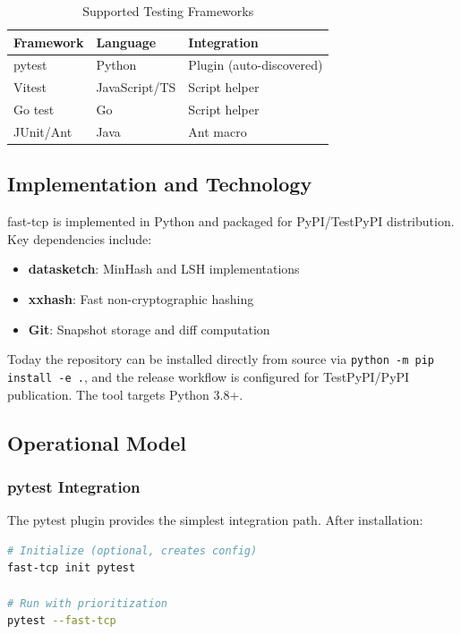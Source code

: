 \documentclass[10pt,conference]{IEEEtran}
\begin{document}
\begin{table}[htbp]
\caption{Supported Testing Frameworks}
\label{tab:frameworks}
\centering
\begin{tabular}{@{}lll@{}}
\toprule
\textbf{Framework} & \textbf{Language} & \textbf{Integration} \\
\midrule
pytest & Python & Plugin (auto-discovered) \\
Vitest & JavaScript/TS & Script helper \\
Go test & Go & Script helper \\
JUnit/Ant & Java & Ant macro \\
\bottomrule
\end{tabular}
\end{table}

\subsection{Implementation and Technology}

fast-tcp is implemented in Python and packaged for PyPI/TestPyPI distribution. Key dependencies include:

\begin{itemize}
    \item \textbf{datasketch}: MinHash and LSH implementations
    \item \textbf{xxhash}: Fast non-cryptographic hashing
    \item \textbf{Git}: Snapshot storage and diff computation
\end{itemize}

Today the repository can be installed directly from source via \texttt{python -m pip install -e .}, and the release workflow is configured for TestPyPI/PyPI publication. The tool targets Python 3.8+.

\subsection{Operational Model}

\subsubsection{pytest Integration}
The pytest plugin provides the simplest integration path. After installation:

\begin{lstlisting}[language=bash,numbers=none]
# Initialize (optional, creates config)
fast-tcp init pytest

# Run with prioritization
pytest --fast-tcp
\end{lstlisting}
\end{document}
